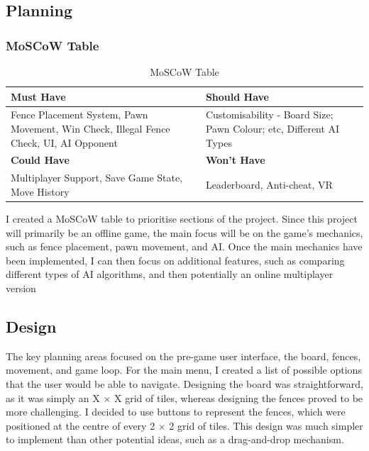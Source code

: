 \documentclass[progress]{cmpreport}
\begin{document}
\subsection{Planning}

\subsubsection{MoSCoW Table}

\begin{table}[h!]
\centering
\begin{tabular}{|>{\raggedright\arraybackslash}m{6cm}|>{\raggedright\arraybackslash}m{6cm}|}
\hline
\textbf{Must Have} & \textbf{Should Have} \\ \hline
Fence Placement System, Pawn Movement, Win Check, Illegal Fence Check, UI, AI Opponent & Customisability - Board Size; Pawn Colour; etc, Different AI Types \\ \hline
\textbf{Could Have} & \textbf{Won't Have} \\ \hline
Multiplayer Support, Save Game State, Move History & Leaderboard, Anti-cheat, VR\\ \hline
\end{tabular}
\caption{MoSCoW Table}
\label{tab:moscow}
\end{table}

\noindent I created a MoSCoW table to prioritise sections of the project. Since this project will primarily be an offline game, the main focus will be on the game's mechanics, such as fence placement, pawn movement, and AI. Once the main mechanics have been implemented, I can then focus on additional features, such as comparing different types of AI algorithms, and then potentially an online multiplayer version

\subsection{Design}
The key planning areas focused on the pre-game user interface, the board, fences, movement, and game loop. For the main menu, I created a list of possible options that the user would be able to navigate. Designing the board was straightforward, as it was simply an X × X grid of tiles, whereas designing the fences proved to be more challenging. I decided to use buttons to represent the fences, which were positioned at the centre of every 2 × 2 grid of tiles. This design was much simpler to implement than other potential ideas, such as a drag-and-drop mechanism.
\end{document}
